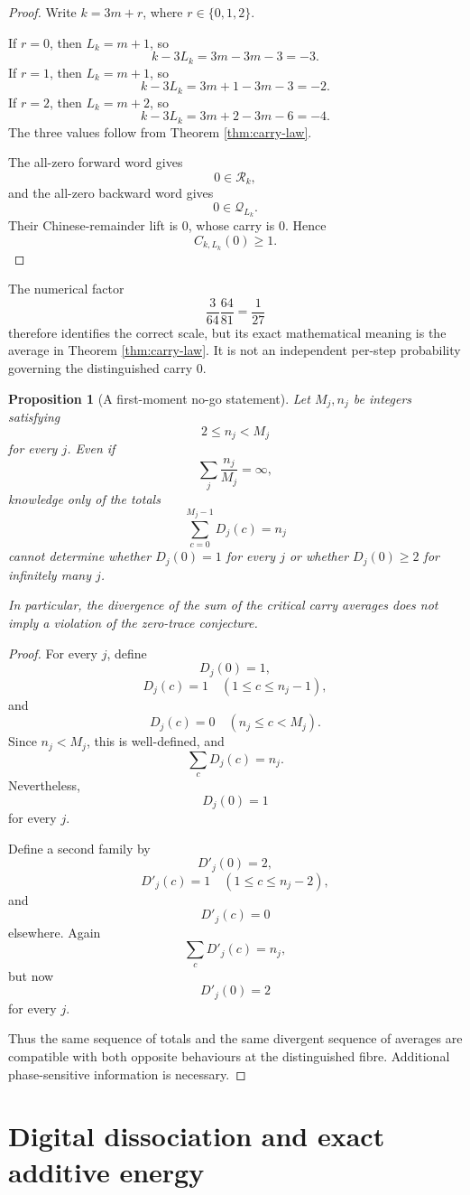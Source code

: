 \documentclass[11pt]{article}
\newtheorem{proposition}[theorem]{Proposition}
\theoremstyle{remark}
\newcommand{\Rset}{\mathcal{R}}
\newcommand{\Qset}{\mathcal{Q}}
\begin{document}
\begin{proof}
Write \(k=3m+r\), where \(r\in\{0,1,2\}\).

If \(r=0\), then \(L_k=m+1\), so
\[
k-3L_k=3m-3m-3=-3.
\]
If \(r=1\), then \(L_k=m+1\), so
\[
k-3L_k=3m+1-3m-3=-2.
\]
If \(r=2\), then \(L_k=m+2\), so
\[
k-3L_k=3m+2-3m-6=-4.
\]
The three values follow from Theorem \ref{thm:carry-law}.

The all-zero forward word gives
\[
0\in\Rset_k,
\]
and the all-zero backward word gives
\[
0\in\Qset_{L_k}.
\]
Their Chinese-remainder lift is \(0\), whose carry is \(0\).  Hence
\[
C_{k,L_k}(0)\ge1.
\]
\end{proof}

The numerical factor
\[
\frac{3}{64}\frac{64}{81}=\frac1{27}
\]
therefore identifies the correct scale, but its exact mathematical meaning is the average in Theorem \ref{thm:carry-law}.  It is not an independent per-step probability governing the distinguished carry \(0\).

\begin{proposition}[A first-moment no-go statement]
\label{prop:first-moment-nogo}
Let \(M_j,n_j\) be integers satisfying
\[
2\le n_j<M_j
\]
for every \(j\).  Even if
\[
\sum_j\frac{n_j}{M_j}=\infty,
\]
knowledge only of the totals
\[
\sum_{c=0}^{M_j-1}D_j(c)=n_j
\]
cannot determine whether \(D_j(0)=1\) for every \(j\) or whether \(D_j(0)\ge2\) for infinitely many \(j\).

In particular, the divergence of the sum of the critical carry averages does not imply a violation of the zero-trace conjecture.
\end{proposition}

\begin{proof}
For every \(j\), define
\[
D_j(0)=1,
\]
\[
D_j(c)=1
\quad
(1\le c\le n_j-1),
\]
and
\[
D_j(c)=0
\quad
(n_j\le c<M_j).
\]
Since \(n_j<M_j\), this is well-defined, and
\[
\sum_cD_j(c)=n_j.
\]
Nevertheless,
\[
D_j(0)=1
\]
for every \(j\).

Define a second family by
\[
D'_j(0)=2,
\]
\[
D'_j(c)=1
\quad
(1\le c\le n_j-2),
\]
and
\[
D'_j(c)=0
\]
elsewhere.  Again
\[
\sum_cD'_j(c)=n_j,
\]
but now
\[
D'_j(0)=2
\]
for every \(j\).

Thus the same sequence of totals and the same divergent sequence of averages are compatible with both opposite behaviours at the distinguished fibre.  Additional phase-sensitive information is necessary.
\end{proof}

\section{Digital dissociation and exact additive energy}
\end{document}
